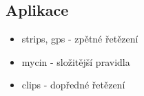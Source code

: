 \subsection{Aplikace}
\begin{framed}
  \begin{itemize}
    \item strips, gps - zpětné řetězení
    \item mycin - složitější pravidla
    \item clips - dopředné řetězení
  \end{itemize}
\end{framed}

